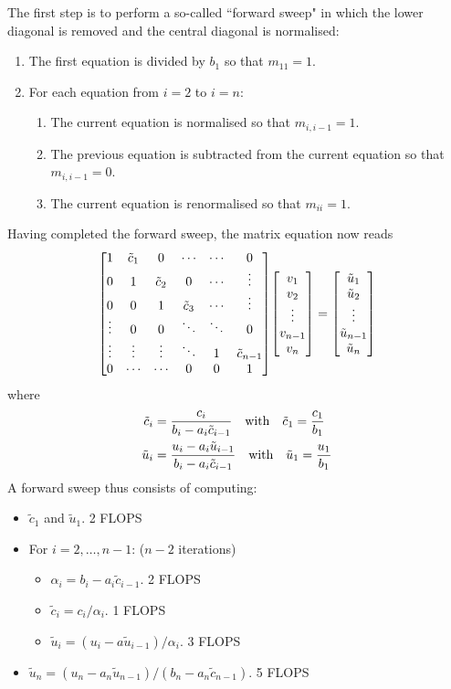 \documentclass[reprint,english]{revtex4-1}
\begin{document}
The first step is to perform a so-called ``forward sweep" in which the lower diagonal is removed and the central diagonal is normalised:
\begin{enumerate}
\item The first equation is divided by \(b_1\) so that \(m_{11}=1\).
\item For each equation from \(i=2\) to \(i=n\):
\begin{enumerate}
	\item The current equation is normalised so that \(m_{i,i-1}=1\).
	\item The previous equation is subtracted from the current equation so that \(m_{i,i-1}=0\).
	\item The current equation is renormalised so that \(m_{ii}=1\).
\end{enumerate}
\end{enumerate}
Having completed the forward sweep, the matrix equation now reads
\[\mqty[1 & \tilde{c}_1 & 0 & \cdots & \cdots & 0 \\
0 & 1 & \tilde{c}_2 & 0 & \cdots & \vdots \\
0 & 0 & 1 & \tilde{c}_3 & \cdots & \vdots \\
\vdots & 0 & 0 & \ddots & \ddots & 0 \\
\vdots & \vdots & \vdots & \ddots & 1 & \tilde{c}_{n-1} \\
0 & \cdots & \cdots & 0 & 0 & 1]\mqty[v_1 \\ v_2 \\ \vdots \\ v_{n-1} \\ v_n]=\mqty[\tilde{u}_1 \\ \tilde{u}_2 \\ \vdots \\ \tilde{u}_{n-1} \\ \tilde{u}_n]\]
where
\begin{align}
\tilde{c}_i&=\frac{c_i}{b_i-a_i\tilde{c}_{i-1}}\qq{with}\tilde{c}_1=\frac{c_1}{b_1}\\
\tilde{u}_i&=\frac{u_i-a_i\tilde{u}_{i-1}}{b_i-a_i\tilde{c}_{i-1}}\qq{with}\tilde{u}_1=\frac{u_1}{b_1}
\end{align}
\newpage\noindent
A forward sweep thus consists of computing:
\begin{itemize}
\renewcommand\labelitemi{\(\times\)}
\renewcommand\labelitemii{\(\to\)}
\item \(\tilde{c}_1\) and \(\tilde{u}_1\). 2 FLOPS
\item For \(i=2,\ldots,n-1\): (\(n-2\) iterations)
	\begin{itemize}
	\item \(\alpha_i=b_i-a_i\tilde{c}_{i-1}\). 2 FLOPS
	\item \(\tilde{c}_i=c_i/\alpha_i\). 1 FLOPS
	\item \(\tilde{u}_i=(u_i-a\tilde{u}_{i-1})/\alpha_i\). 3 FLOPS
	\end{itemize}
\item \(\tilde{u}_n=(u_n-a_n\tilde{u}_{n-1})/(b_n-a_n\tilde{c}_{n-1})\). 5 FLOPS
\end{itemize}
\end{document}

